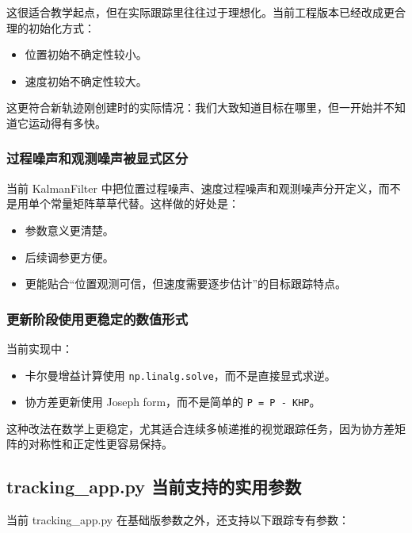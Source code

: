 这很适合教学起点，但在实际跟踪里往往过于理想化。当前工程版本已经改成更合理的初始化方式：

\begin{itemize}
\tightlist
\item
  位置初始不确定性较小。
\item
  速度初始不确定性较大。
\end{itemize}

这更符合新轨迹刚创建时的实际情况：我们大致知道目标在哪里，但一开始并不知道它运动得有多快。

\subsubsection{过程噪声和观测噪声被显式区分}\label{src-experiment-case2-h88}

当前 KalmanFilter
中把位置过程噪声、速度过程噪声和观测噪声分开定义，而不是用单个常量矩阵草草代替。这样做的好处是：

\begin{itemize}
\tightlist
\item
  参数意义更清楚。
\item
  后续调参更方便。
\item
  更能贴合``位置观测可信，但速度需要逐步估计''的目标跟踪特点。
\end{itemize}

\subsubsection{更新阶段使用更稳定的数值形式}\label{src-experiment-case2-h89}

当前实现中：

\begin{itemize}
\tightlist
\item
  卡尔曼增益计算使用
  \passthrough{\lstinline!np.linalg.solve!}，而不是直接显式求逆。
\item
  协方差更新使用 Joseph form，而不是简单的
  \passthrough{\lstinline!P = P - KHP!}。
\end{itemize}

这种改法在数学上更稳定，尤其适合连续多帧递推的视觉跟踪任务，因为协方差矩阵的对称性和正定性更容易保持。

\subsection{tracking\_app.py
当前支持的实用参数}\label{src-experiment-case2-h90}

当前 tracking\_app.py 在基础版参数之外，还支持以下跟踪专有参数：

